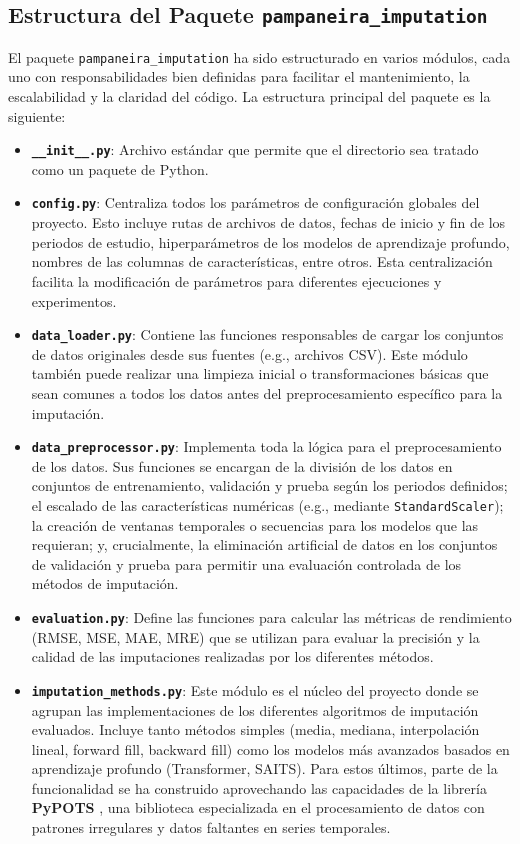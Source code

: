 \subsection{Estructura del Paquete \texttt{pampaneira\_imputation}}
El paquete \texttt{pampaneira\_imputation} ha sido estructurado en varios módulos, cada uno con responsabilidades bien definidas para facilitar el mantenimiento, la escalabilidad y la claridad del código. La estructura principal del paquete es la siguiente:
\begin{itemize}
    \item \textbf{\texttt{\_\_init\_\_.py}}: Archivo estándar que permite que el directorio sea tratado como un paquete de Python.
    \item \textbf{\texttt{config.py}}: Centraliza todos los parámetros de configuración globales del proyecto. Esto incluye rutas de archivos de datos, fechas de inicio y fin de los periodos de estudio, hiperparámetros de los modelos de aprendizaje profundo, nombres de las columnas de características, entre otros. Esta centralización facilita la modificación de parámetros para diferentes ejecuciones y experimentos.
    \item \textbf{\texttt{data\_loader.py}}: Contiene las funciones responsables de cargar los conjuntos de datos originales desde sus fuentes (e.g., archivos CSV). Este módulo también puede realizar una limpieza inicial o transformaciones básicas que sean comunes a todos los datos antes del preprocesamiento específico para la imputación.
    \item \textbf{\texttt{data\_preprocessor.py}}: Implementa toda la lógica para el preprocesamiento de los datos. Sus funciones se encargan de la división de los datos en conjuntos de entrenamiento, validación y prueba según los periodos definidos; el escalado de las características numéricas (e.g., mediante \texttt{StandardScaler}); la creación de ventanas temporales o secuencias para los modelos que las requieran; y, crucialmente, la eliminación artificial de datos en los conjuntos de validación y prueba para permitir una evaluación controlada de los métodos de imputación.
    \item \textbf{\texttt{evaluation.py}}: Define las funciones para calcular las métricas de rendimiento (RMSE, MSE, MAE, MRE) que se utilizan para evaluar la precisión y la calidad de las imputaciones realizadas por los diferentes métodos.
    \item \textbf{\texttt{imputation\_methods.py}}: Este módulo es el núcleo del proyecto donde se agrupan las implementaciones de los diferentes algoritmos de imputación evaluados. Incluye tanto métodos simples (media, mediana, interpolación lineal, forward fill, backward fill) como los modelos más avanzados basados en aprendizaje profundo (Transformer, SAITS). Para estos últimos, parte de la funcionalidad se ha construido aprovechando las capacidades de la librería \textbf{PyPOTS} \citep{du2023pypots}, una biblioteca especializada en el procesamiento de datos con patrones irregulares y datos faltantes en series temporales.

\end{itemize}
